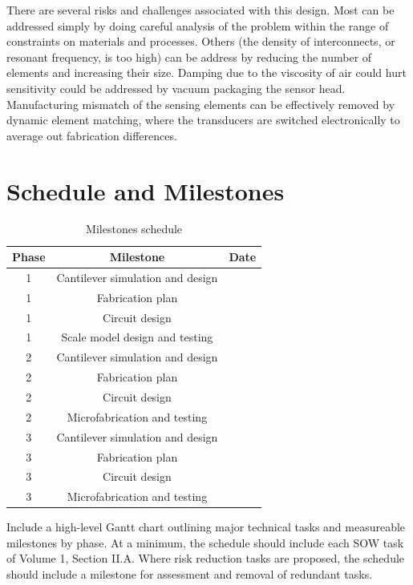 There are several risks and challenges associated with this design. Most can be addressed simply by doing careful analysis of the problem within the range of constraints on materials and processes. Others (the density of interconnects, or resonant frequency, is too high) can be address by reducing the number of elements and increasing their size. Damping due to the viscosity of air could hurt sensitivity could be addressed by vacuum packaging the sensor head. Manufacturing mismatch of the sensing elements can be effectively removed by dynamic element matching, where the transducers are switched electronically to average out fabrication differences.

\section{Schedule and Milestones}

\begin{table}[h!]
\centering
  \begin{tabular}{|c||c|c|}
    \hline
    Phase & Milestone & Date\\
    \hline
    \hline
    1 & Cantilever simulation and design & \\
    \hline
    1 & Fabrication plan & \\
    \hline
    1 & Circuit design & \\
    \hline
    1 & Scale model design and testing & \\
    \hline
    \hline
    2 & Cantilever simulation and design & \\
    \hline
    2 & Fabrication plan & \\
    \hline
    2 & Circuit design & \\
    \hline
    2 & Microfabrication and testing & \\
    \hline
    \hline
    3 & Cantilever simulation and design & \\
    \hline
    3 & Fabrication plan & \\
    \hline
    3 & Circuit design & \\
    \hline
    3 & Microfabrication and testing & \\
    \hline
  \end{tabular}
\caption{Milestones schedule}
\label{table:sched}
\end{table}

Include a high-level Gantt chart outlining major technical tasks and measureable milestones
by phase. At a minimum, the schedule should include each SOW task of Volume 1, Section
II.A. Where risk reduction tasks are proposed, the schedule should include a milestone for
assessment and removal of redundant tasks.

